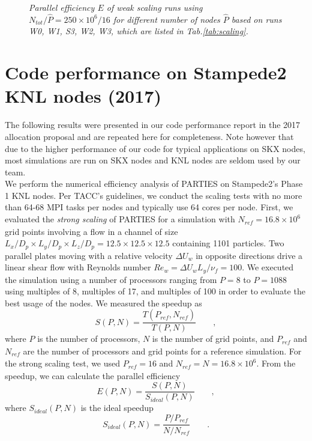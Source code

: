 \documentclass[10pt]{article}
\begin{document}
\begin{figure}[t]
\centering
{}
\caption{\small \textit{Parallel efficiency $E$ of weak scaling runs using $N_{tot}/\hat P =250 \times 10^6 / 16$ for different number of nodes $\hat P$   based on runs W0, W1, S3, W2, W3, which are listed in Tab.\ref{tab:scaling}.}}
\label{fig:skx:weak}
\end{figure}

\clearpage
\section{Code performance on Stampede2 KNL nodes (2017)}
The following results were presented in our code performance report in the 2017 allocation proposal and are repeated here for completeness. Note however that due to the higher performance of our code for typical applications on SKX nodes, most simulations are run on SKX nodes and KNL nodes are seldom used by our team.\\

We perform the numerical efficiency analysis of PARTIES on Stampede2's Phase 1 KNL nodes. Per TACC's guidelines, we conduct the scaling tests with no more than 64-68 MPI tasks per nodes and typically use 64 cores per node. 
First, we evaluated the \textit{strong scaling} of PARTIES for a simulation with $N_\mathit{ref} = 16.8\times10^6$ grid points involving a flow in a channel of size $L_x/D_p \times L_y/D_p \times L_z/D_p = 12.5 \times 12.5 \times 12.5$ containing 1101 particles.  Two parallel plates moving with a relative velocity $\Delta U_w$ in opposite directions drive a linear shear flow with Reynolds number $Re_w = \Delta U_w L_y /\nu_f = 100$.  We executed the simulation using a number of processors ranging from $P=8$ to $P=1088$ using multiples of 8, multiples of 17, and multiples of 100 in order to evaluate the best usage of the nodes.  We measured the speedup as
%
\begin{equation}
S(P,N)=\frac{T(P_\mathit{ref},N_\mathit{ref})}{T(P,N)  } \qquad ,
\end{equation}
%
where $P$ is the number of processors, $N$ is the number of grid points, and $P_\mathit{ref}$ and $N_\mathit{ref}$ are the number of processors and grid points for a reference simulation.  For the strong scaling test, we used $P_\mathit{ref}=16$ and $N_\mathit{ref} = N = 16.8\times10^6$.  From the speedup, we can calculate the parallel efficiency
%
\begin{equation}
E(P,N)=\frac{S(P,N)}{S_\mathit{ideal}(P,N) } \qquad ,
\end{equation}
%
where $S_\mathit{ideal}(P,N)$ is the ideal speedup
%
\begin{equation}
S_\mathit{ideal}(P,N)=\frac{P/P_\mathit{ref}}{N/N_\mathit{ref}} \qquad .
\end{equation}
\end{document}
